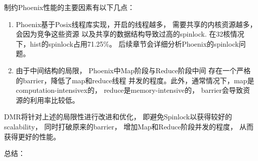 制约Phoenix性能的主要因素有以下几点：
\begin{enumerate}
  \item Phoenix基于Posix线程库实现，开启的线程越多，
  需要共享的内核资源越多，会因为竞争这些资源
  以及共享的数据结构导致过高的spinlock.
  在32核情况下，hist的spinlock占用71.25\%。
  后续章节会详细分析Phoenix的spinlock问题。
  
  \item 由于中间结构的局限，
  Phoenix中Map阶段与Reduce阶段中间
  存在一个严格的barrier，降低了map和reduce线程
  并发的程度。此外，通常情况下，map是computation-intensivex的，
  reduce是memory-intensive的\cite{talbot2011phoenix++}，
  barrier会导致资源的利用率比较低。
\end{enumerate}

DMR将针对上述的局限性进行改进和优化，
即避免Spinlock以获得较好的scalability，
同时打破原来的barrier，
增加Map和Reduce阶段并发的程度，
从而获得更好的性能。








总结：


  
